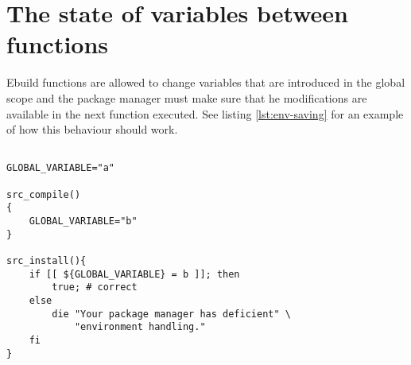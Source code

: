 \section{The state of variables between functions}
\label{ebuild-env-state}

Ebuild functions are allowed to change variables that are introduced in the global scope
and the package manager must make sure that he modifications are available in the next
function executed. See listing \ref{lst:env-saving} for an example of how this behaviour should
work.

\begin{lstlisting}[float,caption=Environment state between functions,label=lst:env-saving]

GLOBAL_VARIABLE="a"

src_compile()
{
    GLOBAL_VARIABLE="b"
}

src_install(){
    if [[ ${GLOBAL_VARIABLE} = b ]]; then
        true; # correct
    else
        die "Your package manager has deficient" \
            "environment handling."
    fi
}
\end{lstlisting}

